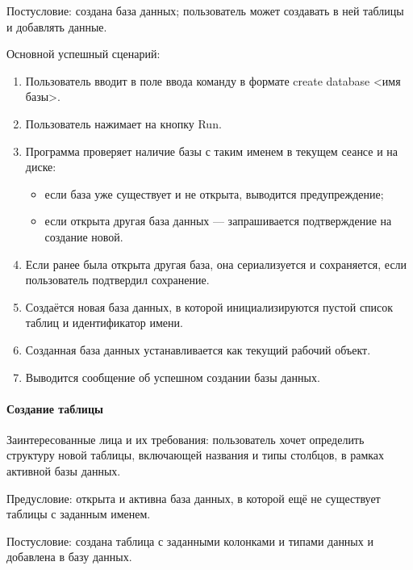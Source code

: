 Постусловие: создана база данных; пользователь может создавать в ней таблицы и добавлять данные.

Основной успешный сценарий:
\begin{enumerate}
	\item Пользователь вводит в поле ввода команду в формате create database <имя базы>.	
	\item Пользователь нажимает на кнопку Run.	
	\item Программа проверяет наличие базы с таким именем в текущем сеансе и на диске:
	\begin{itemize}
		\item если база уже существует и не открыта, выводится предупреждение;	
		\item если открыта другая база данных — запрашивается подтверждение на создание новой.
	\end{itemize}
	\item Если ранее была открыта другая база, она сериализуется и сохраняется, если пользователь подтвердил сохранение.	
	\item Создаётся новая база данных, в которой инициализируются пустой список таблиц и идентификатор имени.	
	\item Созданная база данных устанавливается как текущий рабочий объект.
	\item Выводится сообщение об успешном создании базы данных.	
\end{enumerate}

\paragraph{Создание таблицы}

Заинтересованные лица и их требования: пользователь хочет определить структуру новой таблицы, включающей названия и типы столбцов, в рамках активной базы данных.

Предусловие: открыта и активна база данных, в которой ещё не существует таблицы с заданным именем.

Постусловие: создана таблица с заданными колонками и типами данных и добавлена в базу данных.

